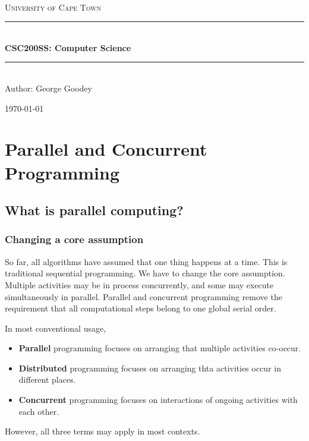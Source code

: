 \documentclass[11pt]{article}
\begin{document}
\begin{titlepage}
    \centering
    
    $\quad$\\[6cm]
    
    \textsc{\LARGE University of Cape Town}\\[1.5cm]
    
    \rule{\linewidth}{0.5mm} \\[0.4cm]
    { \huge \bfseries CSC200SS: Computer Science \\[0.4cm] }
    \rule{\linewidth}{0.5mm} \\[1.5cm]
    
    { \Large Author: George Goodey }
    
    \vfill

    {\large \today}
    
\end{titlepage}

\tableofcontents
\newpage

\section{Parallel and Concurrent Programming}
\subsection{What is parallel computing?}
\subsubsection{Changing a core assumption}
So far, all algorithms have assumed that one thing happens at a time. This is traditional sequential programming.
We have to change the core assumption. Multiple activities may be in process concurrently, and some may execute simultaneously in parallel.
Parallel and concurrent programming remove the requirement that all computational steps belong to one global serial order.
\begin{definition}
In most conventional usage,
\begin{itemize}
    \item \textbf{Parallel} programming focuses on arranging that multiple activities co-occur.
    \item \textbf{Distributed} programming focuses on arranging thta activities occur in different places.
    \item \textbf{Concurrent} programming focuses on interactions of ongoing activities with each other.
\end{itemize}
However, all three terms may apply in most contexts.
\end{definition}
\end{document}
